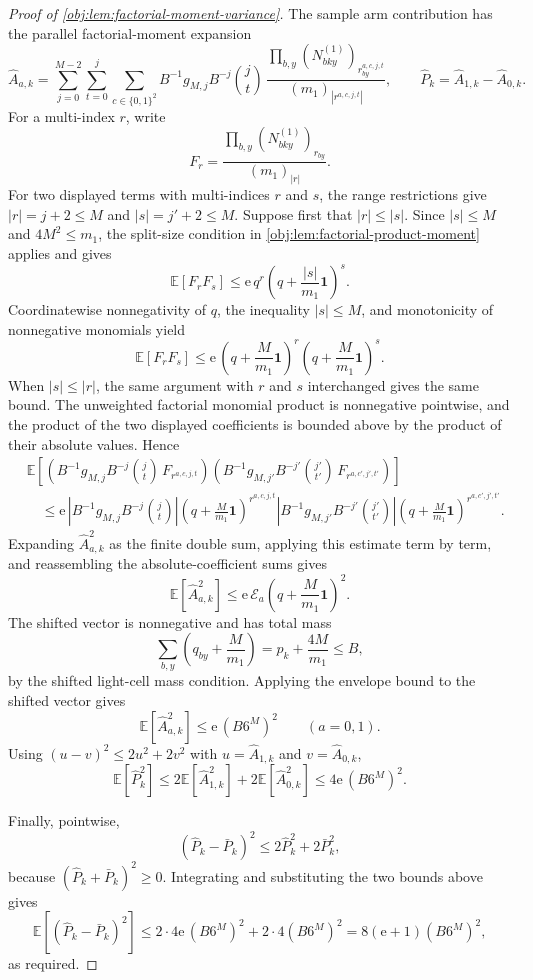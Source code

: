 \documentclass[11pt]{article}
\begin{document}
\begin{proof}[Proof of \cref{obj:lem:factorial-moment-variance}]
The sample arm contribution has the parallel factorial-moment expansion
\[
\widehat A_{a,k}
=
\sum_{j=0}^{M-2}\sum_{t=0}^{j}\sum_{c\in\{0,1\}^2}
B^{-1}g_{M,j}B^{-j}\binom jt\,
\frac{\prod_{b,y}(N^{(1)}_{bky})_{r^{a,c,j,t}_{by}}}{(m_1)_{|r^{a,c,j,t}|}},
\qquad
\widehat P_k=\widehat A_{1,k}-\widehat A_{0,k}.
\]
For a multi-index \(r\), write
\[
F_r=\frac{\prod_{b,y}(N^{(1)}_{bky})_{r_{by}}}{(m_1)_{|r|}}.
\]
For two displayed terms with multi-indices \(r\) and \(s\), the range restrictions give \(|r|=j+2\le M\) and \(|s|=j'+2\le M\). Suppose first that \(|r|\le |s|\). Since \(|s|\le M\) and \(4M^2\le m_1\), the split-size condition in \cref{obj:lem:factorial-product-moment} applies and gives
\[
\mathbb E[F_rF_s]
\le
\mathrm e\,q^r
\left(q+\frac{|s|}{m_1}\mathbf 1\right)^s .
\]
Coordinatewise nonnegativity of \(q\), the inequality \(|s|\le M\), and monotonicity of nonnegative monomials yield
\[
\mathbb E[F_rF_s]
\le
\mathrm e\,
\left(q+\frac{M}{m_1}\mathbf 1\right)^r
\left(q+\frac{M}{m_1}\mathbf 1\right)^s .
\]
When \(|s|\le |r|\), the same argument with \(r\) and \(s\) interchanged gives the same bound. The unweighted factorial monomial product is nonnegative pointwise, and the product of the two displayed coefficients is bounded above by the product of their absolute values. Hence
\[
\begin{aligned}
&\mathbb E\!\left[
\left(B^{-1}g_{M,j}B^{-j}\binom jt\,
F_{r^{a,c,j,t}}\right)
\left(B^{-1}g_{M,j'}B^{-j'}\binom {j'}{t'}\,
F_{r^{a,c',j',t'}}\right)
\right]
\\
&\quad\le
\mathrm e\,
\left|B^{-1}g_{M,j}B^{-j}\binom jt\right|
\left(q+\frac{M}{m_1}\mathbf 1\right)^{r^{a,c,j,t}}
\left|B^{-1}g_{M,j'}B^{-j'}\binom {j'}{t'}\right|
\left(q+\frac{M}{m_1}\mathbf 1\right)^{r^{a,c',j',t'}} .
\end{aligned}
\]
Expanding \(\widehat A_{a,k}^2\) as the finite double sum, applying this estimate term by term, and reassembling the absolute-coefficient sums gives
\[
\mathbb E[\widehat A_{a,k}^2]
\le
\mathrm e\,\mathcal E_a\!\left(q+\frac{M}{m_1}\mathbf 1\right)^2.
\]
The shifted vector is nonnegative and has total mass
\[
\sum_{b,y}\left(q_{by}+\frac{M}{m_1}\right)
=p_k+\frac{4M}{m_1}
\le B,
\]
by the shifted light-cell mass condition. Applying the envelope bound to the shifted vector gives
\[
\mathbb E[\widehat A_{a,k}^2]
\le \mathrm e\,(B6^M)^2
\qquad
(a=0,1).
\]
Using \((u-v)^2\le2u^2+2v^2\) with \(u=\widehat A_{1,k}\) and \(v=\widehat A_{0,k}\),
\[
\mathbb E[\widehat P_k^2]
\le 2\mathbb E[\widehat A_{1,k}^2]+2\mathbb E[\widehat A_{0,k}^2]
\le4\mathrm e\,(B6^M)^2.
\]

Finally, pointwise,
\[
(\widehat P_k-\bar P_k)^2
\le 2\widehat P_k^2+2\bar P_k^2,
\]
because \((\widehat P_k+\bar P_k)^2\ge0\). Integrating and substituting the two bounds above gives
\[
\mathbb E\!\left[(\widehat P_k-\bar P_k)^2\right]
\le
2\cdot4\mathrm e\,(B6^M)^2+2\cdot4(B6^M)^2
=
8(\mathrm e+1)(B6^M)^2,
\]
as required.
\end{proof}
\end{document}
